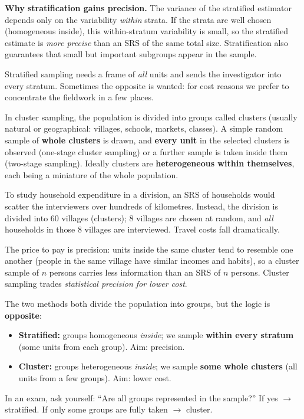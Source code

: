 \documentclass[11pt]{article}
\newcommand{\cle}[1]{{\popxbold\color{popdark}#1}}
\newcounter{popsec}
\newcounter{popsub}
\newcommand{\courssub}[1]{%
  \stepcounter{popsub}%
  \par\vspace{9pt}\noindent{\popxbold\fontsize{11.5}{13}\selectfont\color{popink}{\color{poporange}\thepopsec.\thepopsub}\hspace{6pt}#1}\par\nopagebreak\vspace{4pt}
}
\begin{document}
\textbf{Why stratification gains precision.} The variance of the stratified estimator depends only on the variability \emph{within} strata. If the strata are well chosen (homogeneous inside), this within-stratum variability is small, so the stratified estimate is \emph{more precise} than an SRS of the same total size. Stratification also guarantees that small but important subgroups appear in the sample.

\courssub{Cluster Sampling}

Stratified sampling needs a frame of \emph{all} units and sends the investigator into every stratum. Sometimes the opposite is wanted: for cost reasons we prefer to concentrate the fieldwork in a few places.

\begin{definition}
In \cle{cluster sampling}, the population is divided into groups called \cle{clusters} (usually natural or geographical: villages, schools, markets, classes). A simple random sample of \textbf{whole clusters} is drawn, and \textbf{every unit} in the selected clusters is observed (one-stage cluster sampling) or a further sample is taken inside them (two-stage sampling). Ideally clusters are \textbf{heterogeneous within themselves}, each being a miniature of the whole population.
\end{definition}

\begin{exemplebox}
To study household expenditure in a division, an SRS of households would scatter the interviewers over hundreds of kilometres. Instead, the division is divided into $60$ villages (clusters); $8$ villages are chosen at random, and \emph{all} households in those $8$ villages are interviewed. Travel costs fall dramatically.
\end{exemplebox}

The price to pay is precision: units inside the same cluster tend to resemble one another (people in the same village have similar incomes and habits), so a cluster sample of $n$ persons carries less information than an SRS of $n$ persons. Cluster sampling trades \emph{statistical precision for lower cost}.

\begin{attention}
The two methods both divide the population into groups, but the logic is \textbf{opposite}:
\begin{itemize}
\item \textbf{Stratified:} groups homogeneous \emph{inside}; we sample \textbf{within every stratum} (some units from each group). Aim: precision.
\item \textbf{Cluster:} groups heterogeneous \emph{inside}; we sample \textbf{some whole clusters} (all units from a few groups). Aim: lower cost.
\end{itemize}
In an exam, ask yourself: ``Are all groups represented in the sample?'' If yes $\to$ stratified. If only some groups are fully taken $\to$ cluster.
\end{attention}
\end{document}
